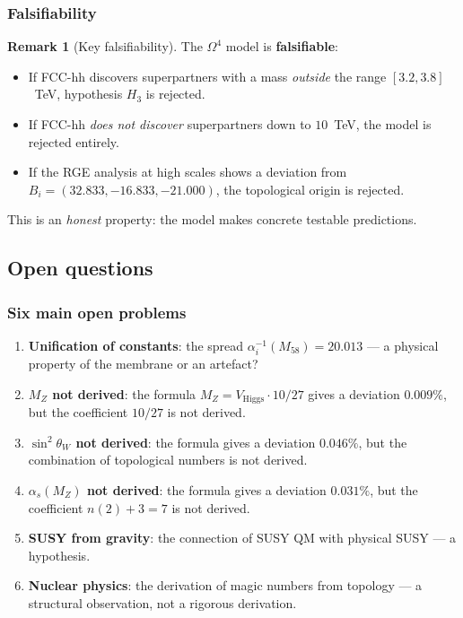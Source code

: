 \documentclass[11pt,a4paper]{article}
\newcommand{\Om}{\ensuremath{\Omega^4}}
\theoremstyle{definition}
\newtheorem{remark}[theorem]{Remark}
\begin{document}
\subsubsection{Falsifiability}

\begin{remark}[Key falsifiability]
\label{rem:conclusions-falsifiability}
The $\Om$ model is \textbf{falsifiable}:
\begin{itemize}
    \item If FCC-hh discovers superpartners with a mass
          \emph{outside} the range $[3.2, 3.8]$~TeV,
          hypothesis $H_3$ is rejected.
    \item If FCC-hh \emph{does not discover} superpartners
          down to $10$~TeV, the model is rejected entirely.
    \item If the RGE analysis at high scales shows
          a deviation from $B_i = (32.833, -16.833, -21.000)$,
          the topological origin is rejected.
\end{itemize}
This is an \emph{honest} property: the model makes concrete
testable predictions.
\end{remark}

\subsection{Open questions}
\label{subsec:conclusions-open}

\subsubsection{Six main open problems}

\begin{enumerate}
    \item \textbf{Unification of constants}: the spread
          $\alpha_i^{-1}(M_{58}) = 20.013$ ---
          a physical property of the membrane or an artefact?
    \item \textbf{$M_Z$ not derived}: the formula
          $M_Z = V_{\text{Higgs}} \cdot 10/27$ gives
          a deviation $0.009\%$, but the coefficient $10/27$
          is not derived.
    \item \textbf{$\sin^2\theta_W$ not derived}: the formula
          gives a deviation $0.046\%$, but the combination of
          topological numbers is not derived.
    \item \textbf{$\alpha_s(M_Z)$ not derived}: the formula
          gives a deviation $0.031\%$, but the coefficient
          $n(2) + 3 = 7$ is not derived.
    \item \textbf{SUSY from gravity}: the connection of SUSY QM
          with physical SUSY --- a hypothesis.
    \item \textbf{Nuclear physics}: the derivation of magic numbers
          from topology --- a structural observation,
          not a rigorous derivation.
\end{enumerate}
\end{document}
